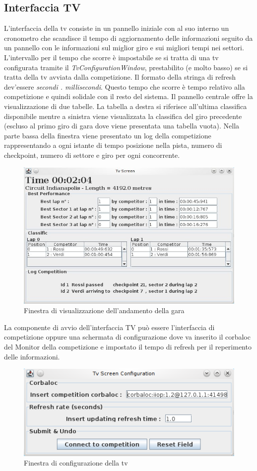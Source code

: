\subsection{Interfaccia TV}
\label{interfacciaTv}
L'interfaccia della tv consiste in un pannello iniziale con al suo interno un cronometro che scandisce il tempo di aggiornamento delle informazioni seguito da un pannello con le informazioni sul miglior giro e sui migliori tempi nei settori.
L'intervallo per il tempo che scorre \`{e} impostabile se si tratta di una tv configurata tramite il \emph{TvConfigurationWindow}, prestabilito (e molto basso) se si tratta della tv avviata dalla competizione. Il formato della stringa di refresh dev'essere \emph{secondi . millisecondi}.
Questo tempo che scorre \`{e} tempo relativo alla competizione e quindi solidale con il resto del sistema.
Il pannello centrale offre la visualizzazione di due tabelle. La tabella a destra si riferisce all'ultima classifica disponibile mentre a sinistra viene visualizzata la classifica del giro precedente (escluso al primo giro di gara dove viene presentata una tabella vuota).
Nella parte bassa della finestra viene presentato un log della competizione rappresentando a ogni istante di tempo posizione nella pista, numero di checkpoint, numero di settore e giro per ogni concorrente.
\begin{center}
\begin{figure}[h]
	\includegraphics[scale=0.75]{img/ScreenshotRelazione/screenTvCompetition.jpg}
	\caption{Finestra di visualizzazione dell'andamento della gara}
\end{figure}
\end{center}
La componente di avvio dell'interfaccia TV pu\`{o} essere l'interfaccia di competizione oppure una schermata di configurazione dove va inserito il corbaloc del Monitor della competizione e impostato il tempo di refresh per il reperimento delle informazioni.
\begin{center}
\begin{figure}[H]
	\includegraphics[scale=0.75]{img/ScreenshotRelazione/configurationScreen.jpg}
	\caption{Finestra di configurazione della tv}
\end{figure}
\end{center}
